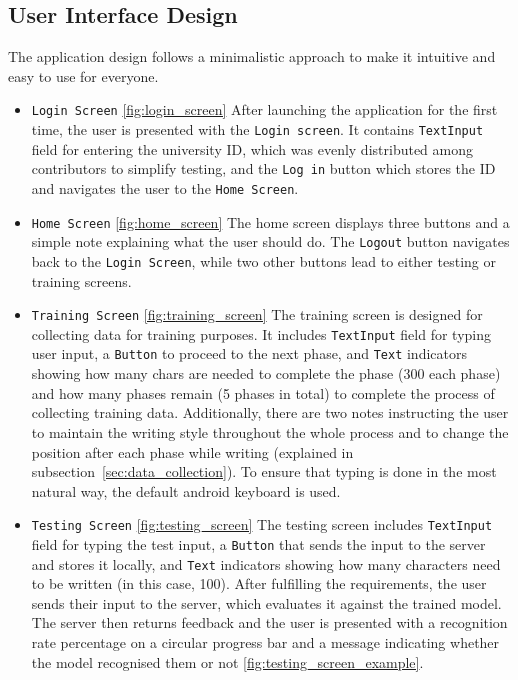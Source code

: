 \subsection{User Interface Design}
The application design follows a minimalistic approach to make it intuitive and easy to use for everyone. 
\begin{itemize}
	\item 
	\texttt{Login Screen} \ref{fig:login_screen} \newline
	After launching the application for the first time, the user is presented with the \texttt{Login screen}. It contains \texttt{TextInput} field for entering the university ID, which was evenly distributed among contributors to simplify testing, and the \texttt{Log in} button which stores the ID and navigates the user to the \texttt{Home Screen}.
	\item 
	\texttt{Home Screen} \ref{fig:home_screen} \newline
	The home screen displays three buttons and a simple note explaining what the user should do. The \texttt{Logout} button navigates back to the \texttt{Login Screen}, while two other buttons lead to either testing or training screens.
	\item 
	\texttt{Training Screen} \ref{fig:training_screen} \newline
	The training screen is designed for collecting data for training purposes. It includes \texttt{TextInput} field for typing user input, a \texttt{Button} to proceed to the next phase, and \texttt{Text} indicators showing how many chars are needed to complete the phase (300 each phase) and how many phases remain (5 phases in total) to complete the process of collecting training data. Additionally, there are two notes instructing the user to maintain the writing style throughout the whole process and to change the position after each phase while writing (explained in subsection~\ref{sec:data_collection}). \newline
	To ensure that typing is done in the most natural way, the default android keyboard is used. 
	\item 
	\texttt{Testing Screen} \ref{fig:testing_screen} \newline
	The testing screen includes \texttt{TextInput} field for typing the test input, a \texttt{Button} that sends the input to the server and stores it locally, and \texttt{Text} indicators showing how many characters need to be written (in this case, 100). After fulfilling the requirements, the user sends their input to the server, which evaluates it against the trained model. The server then returns feedback and the user is presented with a recognition rate percentage on a circular progress bar and a message indicating whether the model recognised them or not \ref{fig:testing_screen_example}. 
\end{itemize}


